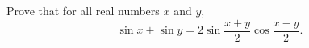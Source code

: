 Prove that for all real numbers $x$ and $y$,
\[\sin x+\sin y=2\sin\dfrac{x+y}{2}\cos\dfrac{x-y}{2}.\]
